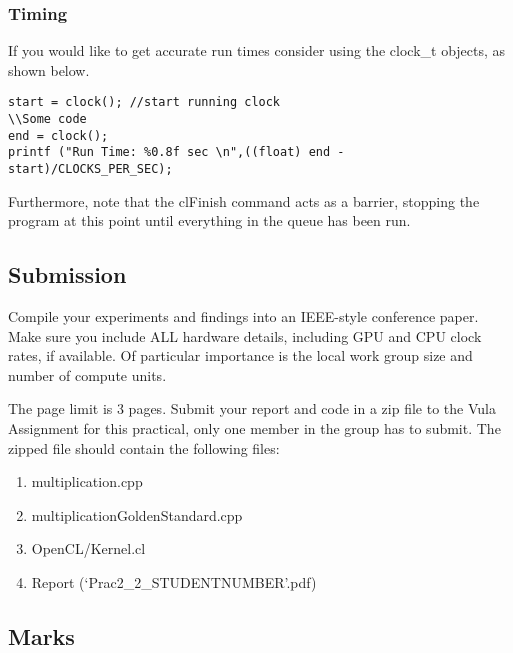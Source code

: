 \subsubsection{Timing}
If you would like to get accurate run times consider using the clock\_t objects, as shown below.

\begin{lstlisting}
start = clock(); //start running clock
\\Some code
end = clock();
printf ("Run Time: %0.8f sec \n",((float) end - start)/CLOCKS_PER_SEC);
\end{lstlisting}

Furthermore, note that the clFinish command acts as a barrier, stopping the program at this point until everything in the queue has been run.

\newpage
\subsection{Submission}
Compile your experiments and findings into an IEEE-style conference paper. Make sure you include ALL hardware details, including GPU and CPU clock rates, if available. Of particular importance is the local work group size and number of compute units.

The page limit is 3 pages. Submit your report and code in a zip file to the Vula Assignment for this practical, only one member in the group has to submit. The zipped file should contain the following files:
\begin{enumerate}
    \item multiplication.cpp
    \item multiplicationGoldenStandard.cpp
    \item OpenCL/Kernel.cl
    \item Report (`Prac2\_2\_STUDENTNUMBER'.pdf)
\end{enumerate}

\subsection{Marks}

